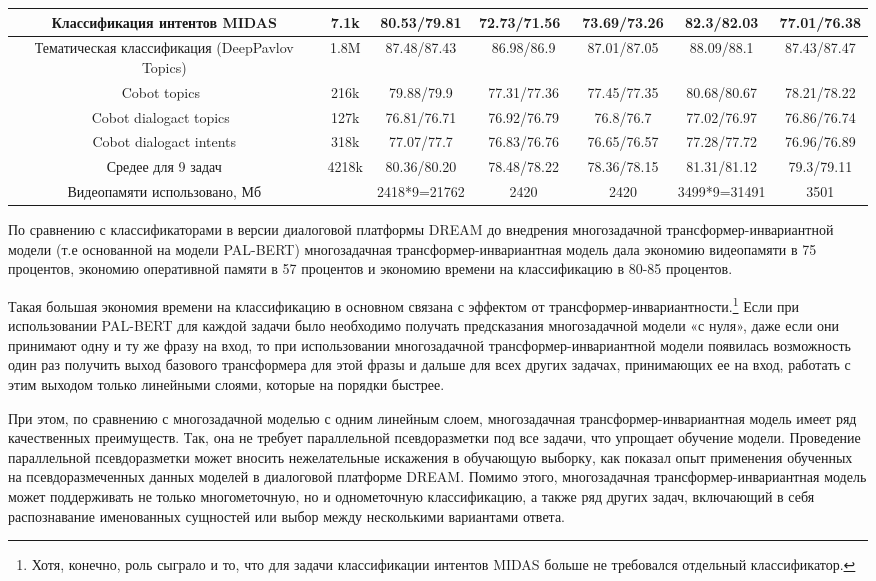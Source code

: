 \begin{table}[htbp]
{\begin{tabular}{|c||c|c|c|c|c|c|}
Классификация интентов MIDAS          & 7.1k & 80.53/79.81 & 72.73/71.56~ & 73.69/73.26 & 82.3/82.03  & 77.01/76.38 \\ \hline
Тематическая классификация (DeepPavlov Topics) & 1.8M & 87.48/87.43 & 86.98/86.9  & 87.01/87.05         & 88.09/88.1  & 87.43/87.47 \\ \hline
Cobot topics~                  & 216k & 79.88/79.9  & 77.31/77.36 & 77.45/77.35         & 80.68/80.67 & 78.21/78.22 \\ \hline
Cobot dialogact topics~             & 127k & 76.81/76.71 & 76.92/76.79 & 76.8/76.7          & 77.02/76.97 & 76.86/76.74 \\ \hline
Cobot dialogact intents             & 318k & 77.07/77.7  & 76.83/76.76 & 76.65/76.57         & 77.28/77.72 & 76.96/76.89 \\ \hline
Средее для 9 задач                   & 4218k & 80.36/80.20    & 78.48/78.22 & 78.36/78.15         & 81.31/81.12  & 79.3/79.11 \\ \hline
Видеопамяти использовано, Мб               &    & 2418*9=21762 & 2420     & 2420             & 3499*9=31491 & 3501    \\ \hline
\end{tabular}
}
\end{table}

По сравнению с классификаторами в версии диалоговой платформы DREAM до внедрения многозадачной трансформер-инвариантной модели (т.е основанной на модели PAL-BERT) многозадачная трансформер-инвариантная модель дала экономию видеопамяти в 75 процентов, экономию оперативной памяти в 57 процентов и экономию времени на классификацию в 80-85 процентов.
 
Такая большая экономия времени на классификацию в основном связана с эффектом от трансформер-инвариантности.\footnote{Хотя, конечно, роль сыграло и то, что для задачи классификации интентов MIDAS больше не требовался отдельный классификатор.} Если при использовании PAL-BERT для каждой задачи было необходимо получать предсказания многозадачной модели «с нуля», даже если они принимают одну и ту же фразу на вход, то при использовании многозадачной трансформер-инвариантной модели появилась возможность один раз получить выход базового трансформера для этой фразы и дальше для всех других задачах, принимающих ее на вход, работать с этим выходом только линейными слоями, которые на порядки быстрее.

При этом, по сравнению с многозадачной моделью с одним линейным слоем, многозадачная трансформер-инвариантная модель имеет ряд качественных преимуществ. Так, она не требует параллельной псевдоразметки под все задачи, что упрощает обучение модели. Проведение параллельной псевдоразметки может вносить нежелательные искажения в обучающую выборку, как показал опыт применения обученных на псевдоразмеченных данных моделей в диалоговой платформе DREAM. Помимо этого, многозадачная трансформер-инвариантная модель может поддерживать не только многометочную, но и однометочную классификацию, а также ряд других задач, включающий в себя распознавание именованных сущностей или выбор между несколькими вариантами ответа.

